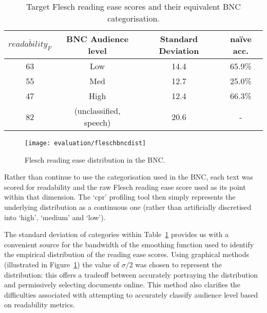 \begin{table}[h]
    \center
    \begin{tabular}{|c|c|c|c|}
        \hline 
        $\bar{readability_{F}}$ & BNC Audience level & Standard Deviation & na\"ive acc. \\
        \hline 
        63 & Low & 14.4 & 65.9\% \\
        55 & Med & 12.7 & 25.0\% \\
        47 & High & 12.4 & 66.3\% \\
        82 & (unclassified, speech) & 20.6 & - \\
        \hline
    \end{tabular}
    \caption{Target Flesch reading ease scores and their equivalent BNC categorisation.}
    \label{tab:evaluation:heuristics:fscore}
\end{table}




\begin{figure}[h]
    \centering
    \texttt{[image: evaluation/fleschbncdist]}
    \caption{Flesch reading ease distribution in the BNC.}
    \label{fig:evaluation:heuristics:fleschbncdist}
\end{figure}


Rather than continue to use the categorisation used in the BNC, each text was scored for readability and the raw Flesch reading ease score used as its point within that dimension.  The `cpr' profiling tool then simply represents the underlying distribution as a continuous one (rather than artificially discretised into `high', `medium' and `low').

The standard deviation of categories within Table~\ref{tab:evaluation:heuristics:fscore} provides us with a convenient source for the bandwidth of the smoothing function used to identify the empirical distribution of the reading ease scores.  Using graphical methods (illustrated in Figure~\ref{fig:evaluation:heuristics:fleschbncdist}) the value of $\sigma / 2$ was chosen to represent the distribution: this offers a tradeoff between accurately portraying the distribution and permissively selecting documents online.  This method also clarifies the difficulties associated with attempting to accurately classify audience level based on readability metrics.

